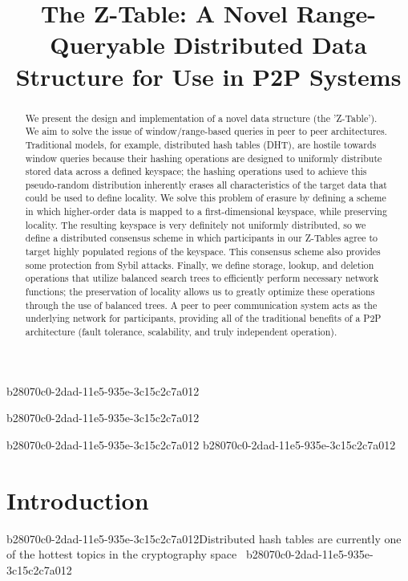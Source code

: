 \documentclass[12pt]{article}
\title{The Z-Table: A Novel Range-Queryable Distributed Data Structure for Use in P2P Systems}
\begin{document}
b28070c0-2dad-11e5-935e-3c15c2c7a012
\maketitle

b28070c0-2dad-11e5-935e-3c15c2c7a012\begin{abstract}
We present the design and implementation of a novel data structure (the 'Z-Table'). We aim to solve the issue of window/range-based queries in peer to peer architectures. Traditional models, for example,  distributed hash tables (DHT), are hostile towards window queries because their hashing operations are designed to uniformly distribute stored data across a defined keyspace; the hashing operations used to achieve this pseudo-random distribution inherently erases all characteristics of the target data that could be used to define locality. We solve this problem of erasure by defining a scheme in which higher-order data is mapped to a first-dimensional keyspace, while preserving locality. The resulting keyspace is very definitely not uniformly distributed, so we define a distributed consensus scheme in which participants in our Z-Tables agree to target highly populated regions of the keyspace. This consensus scheme also provides some protection from Sybil attacks. Finally, we define storage, lookup, and deletion operations that utilize balanced search trees to efficiently perform necessary network functions; the preservation of locality allows us to greatly optimize these operations through the use of balanced trees. A peer to peer communication system acts as the underlying network for participants, providing all of the traditional benefits of a P2P architecture (fault tolerance, scalability, and truly independent operation).
\end{abstract}


b28070c0-2dad-11e5-935e-3c15c2c7a012\newpage
b28070c0-2dad-11e5-935e-3c15c2c7a012\section{Introduction}
b28070c0-2dad-11e5-935e-3c15c2c7a012Distributed hash tables are currently one of the hottest topics in the cryptography space~\cite{Stoica:2001dj,Rowstron:2001ea,Ratnasamy:2001wn}
b28070c0-2dad-11e5-935e-3c15c2c7a012
\printbibliography
\end{document}
